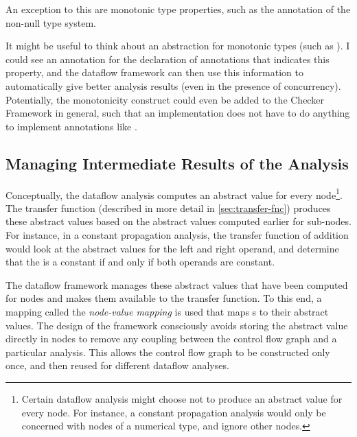 An exception to this are monotonic type properties, such as the  annotation
of the non-null type system.

\begin{workinprogress}
    It might be useful to think about an abstraction for monotonic types (such as ).
    I could see an annotation for the declaration of annotations that indicates this property, and the
    dataflow framework can then use this information to automatically give better analysis results (even
    in the presence of concurrency).  Potentially, the monotonicity construct could even be added
    to the Checker Framework in general, such that an implementation does not have to do anything
    to implement annotations like .
\end{workinprogress}




\subsection{Managing Intermediate Results of the Analysis}
\label{sec:node-mapping}
\label{sec:store-management}

Conceptually, the dataflow analysis computes an abstract value for every node\footnote{Certain
dataflow analysis might choose not to produce an abstract value for every node.  For instance,
a constant propagation analysis would only be concerned with nodes of a numerical type, and
ignore other nodes.}.
The transfer function (described in more detail in \autoref{sec:transfer-fnc}) produces these abstract
values based on the abstract values computed earlier for sub-nodes.
For instance, in a constant propagation analysis, the transfer function of addition would look at
the abstract values for the left and right operand, and determine that the 
is a constant if and only if both operands are constant.

The dataflow framework manages these abstract values that have been computed for nodes and
makes them available to the transfer function.  To this end, a mapping called the
\emph{node-value mapping} is used that maps s to their abstract values.
The design of the framework consciously avoids storing the abstract value directly in
nodes to remove any coupling between the control flow graph and a particular analysis.
This allows the control flow graph to be constructed only once, and then reused for different
dataflow analyses.

